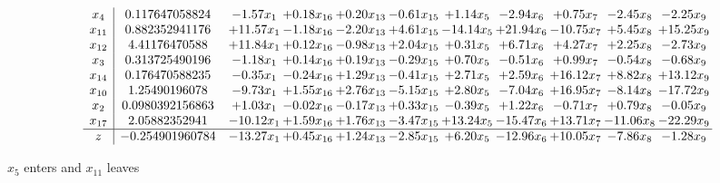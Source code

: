 \documentclass[9pt]{article}
\begin{document}
 \[\begin{array}{c| c c@{\hskip 2pt} c@{\hskip 2pt} c@{\hskip 2pt} c@{\hskip 2pt} c@{\hskip 2pt} c@{\hskip 2pt} c@{\hskip 2pt} c@{\hskip 2pt} c@{\hskip 2pt} }
 x_{4}   &  0.117647058824 & -1.57 x_{1} & +  0.18 x_{16} & +  0.20 x_{13} & -0.61 x_{15} & +  1.14 x_{5} & -2.94 x_{6} & +  0.75 x_{7} & -2.45 x_{8} & -2.25 x_{9}\\
 x_{11}   &  0.882352941176 & + 11.57 x_{1} & -1.18 x_{16} & -2.20 x_{13} & +  4.61 x_{15} & -14.14 x_{5} & + 21.94 x_{6} & -10.75 x_{7} & +  5.45 x_{8} & + 15.25 x_{9}\\
 x_{12}   &  4.41176470588 & + 11.84 x_{1} & +  0.12 x_{16} & -0.98 x_{13} & +  2.04 x_{15} & +  0.31 x_{5} & +  6.71 x_{6} & +  4.27 x_{7} & +  2.25 x_{8} & -2.73 x_{9}\\
 x_{3}   &  0.313725490196 & -1.18 x_{1} & +  0.14 x_{16} & +  0.19 x_{13} & -0.29 x_{15} & +  0.70 x_{5} & -0.51 x_{6} & +  0.99 x_{7} & -0.54 x_{8} & -0.68 x_{9}\\
 x_{14}   &  0.176470588235 & -0.35 x_{1} & -0.24 x_{16} & +  1.29 x_{13} & -0.41 x_{15} & +  2.71 x_{5} & +  2.59 x_{6} & + 16.12 x_{7} & +  8.82 x_{8} & + 13.12 x_{9}\\
 x_{10}   &  1.25490196078 & -9.73 x_{1} & +  1.55 x_{16} & +  2.76 x_{13} & -5.15 x_{15} & +  2.80 x_{5} & -7.04 x_{6} & + 16.95 x_{7} & -8.14 x_{8} & -17.72 x_{9}\\
 x_{2}   &  0.0980392156863 & +  1.03 x_{1} & -0.02 x_{16} & -0.17 x_{13} & +  0.33 x_{15} & -0.39 x_{5} & +  1.22 x_{6} & -0.71 x_{7} & +  0.79 x_{8} & -0.05 x_{9}\\
 x_{17}   &  2.05882352941 & -10.12 x_{1} & +  1.59 x_{16} & +  1.76 x_{13} & -3.47 x_{15} & + 13.24 x_{5} & -15.47 x_{6} & + 13.71 x_{7} & -11.06 x_{8} & -22.29 x_{9}\\
\hline
z    &  -0.254901960784 & -13.27 x_{1} & +  0.45 x_{16} & +  1.24 x_{13} & -2.85 x_{15} & +  6.20 x_{5} & -12.96 x_{6} & + 10.05 x_{7} & -7.86 x_{8} & -1.28 x_{9}\\
\end{array}\]


 $ x_{5} $ enters and $ x_{11} $ leaves 
\end{document}

